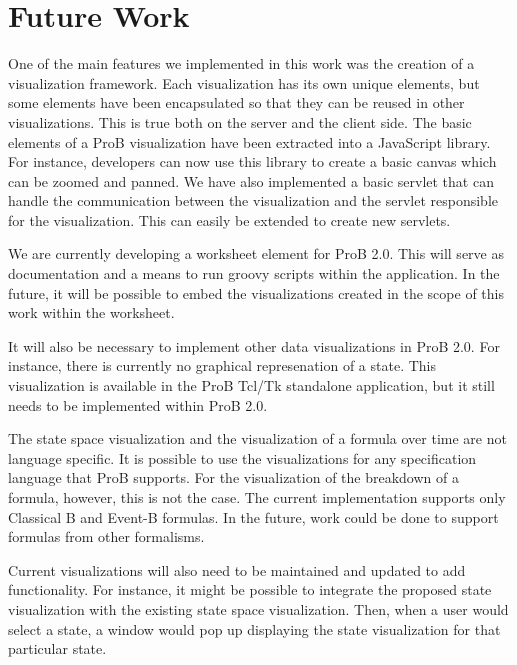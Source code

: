 \section{Future Work}

One of the main features we implemented in this work was the creation of a visualization framework. Each visualization has its own unique elements, but some elements have been encapsulated so that they can be reused in other visualizations. This is true both on the server and the client side. The basic elements of a ProB visualization have been extracted into a JavaScript library. For instance, developers can now use this library to create a basic canvas which can be zoomed and panned. We have also implemented a basic servlet that can handle the communication between the visualization and the servlet responsible for the visualization. This can easily be extended to create new servlets.

We are currently developing a worksheet element for ProB 2.0. This will serve as documentation and a means to run groovy scripts within the application. In the future, it will be possible to embed the visualizations created in the scope of this work within the worksheet. 

It will also be necessary to implement other data visualizations in ProB 2.0. For instance, there is currently no graphical represenation of a state. This visualization is available in the ProB Tcl/Tk standalone application, but it still needs to be implemented within ProB 2.0.

The state space visualization and the visualization of a formula over time are not language specific. It is possible to use the visualizations for any specification language that ProB supports. For the visualization of the breakdown of a formula, however, this is not the case. The current implementation supports only Classical B and Event-B formulas. In the future, work could be done to support formulas from other formalisms.

Current visualizations will also need to be maintained and updated to add functionality. For instance, it might be possible to integrate the proposed state visualization with the existing state space visualization. Then, when a user would select a state, a window would pop up displaying the state visualization for that particular state.